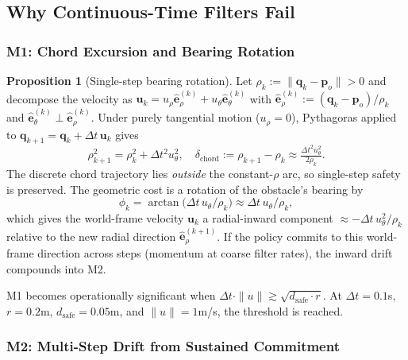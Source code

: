 \documentclass[letterpaper]{article}
\begin{document}
\subsection{Why Continuous-Time Filters Fail}
\label{sec:failure}

\subsubsection{M1: Chord Excursion and Bearing Rotation}

\textbf{Proposition 1} (Single-step bearing rotation). Let $\rho_k := \|\boldsymbol{q}_k - \boldsymbol{p}_o\| > 0$ and decompose the velocity as $\boldsymbol{u}_k = u_\rho \hat{\boldsymbol{e}}_\rho^{(k)} + u_\theta \hat{\boldsymbol{e}}_\theta^{(k)}$ with $\hat{\boldsymbol{e}}_\rho^{(k)} := (\boldsymbol{q}_k - \boldsymbol{p}_o)/\rho_k$ and $\hat{\boldsymbol{e}}_\theta^{(k)} \perp \hat{\boldsymbol{e}}_\rho^{(k)}$. Under purely tangential motion ($u_\rho = 0$), Pythagoras applied to $\boldsymbol{q}_{k+1} = \boldsymbol{q}_k + \Delta t\,\boldsymbol{u}_k$ gives
\begin{equation}
\rho_{k+1}^2 = \rho_k^2 + \Delta t^2 u_\theta^2,\quad
\delta_\text{chord} := \rho_{k+1}{-}\rho_k \approx \tfrac{\Delta t^2 u_\theta^2}{2\rho_k}.
\label{eq:m1}
\end{equation}
The discrete chord trajectory lies \emph{outside} the constant-$\rho$ arc, so single-step safety is preserved. The geometric cost is a rotation of the obstacle's bearing by
\begin{equation}
\phi_k = \arctan\!\bigl(\Delta t\, u_\theta / \rho_k\bigr) \approx \Delta t\, u_\theta / \rho_k,
\label{eq:m1-rot}
\end{equation}
which gives the world-frame velocity $\boldsymbol{u}_k$ a radial-inward component $\approx -\Delta t\, u_\theta^2 / \rho_k$ relative to the new radial direction $\hat{\boldsymbol{e}}_\rho^{(k+1)}$. If the policy commits to this world-frame direction across steps (momentum at coarse filter rates), the inward drift compounds into M2.

M1 becomes operationally significant when $\Delta t \cdot \|u\| \gtrsim \sqrt{d_\text{safe} \cdot r}$. At $\Delta t = 0.1$s, $r = 0.2$m, $d_\text{safe} = 0.05$m, and $\|u\| = 1$m/s, the threshold is reached.

\subsubsection{M2: Multi-Step Drift from Sustained Commitment}
\end{document}
